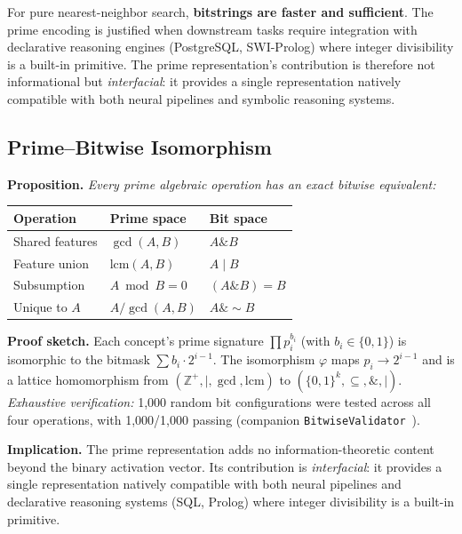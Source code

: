 \documentclass[10pt]{article}
\begin{document}
\noindent For pure nearest-neighbor search, \textbf{bitstrings are faster and sufficient}. The prime encoding is justified when downstream tasks require integration with declarative reasoning engines (PostgreSQL, SWI-Prolog) where integer divisibility is a built-in primitive. The prime representation's contribution is therefore not informational but \emph{interfacial}: it provides a single representation natively compatible with both neural pipelines and symbolic reasoning systems.

\subsection{Prime--Bitwise Isomorphism}

\noindent\textbf{Proposition.} \emph{Every prime algebraic operation has an exact bitwise equivalent:}

\begin{center}
\small
\begin{tabular}{lll}
\toprule
\textbf{Operation} & \textbf{Prime space} & \textbf{Bit space} \\
\midrule
Shared features & $\gcd(A, B)$ & $A \mathbin{\&} B$ \\
Feature union & $\text{lcm}(A, B)$ & $A \mathbin{|} B$ \\
Subsumption & $A \bmod B = 0$ & $(A \mathbin{\&} B) = B$ \\
Unique to $A$ & $A / \gcd(A,B)$ & $A \mathbin{\&} {\sim}B$ \\
\bottomrule
\end{tabular}
\end{center}

\noindent\textbf{Proof sketch.} Each concept's prime signature $\prod p_i^{b_i}$ (with $b_i \in \{0,1\}$) is isomorphic to the bitmask $\sum b_i \cdot 2^{i-1}$. The isomorphism $\varphi$ maps $p_i \to 2^{i-1}$ and is a lattice homomorphism from $(\mathbb{Z}^+, \mid, \gcd, \text{lcm})$ to $(\{0,1\}^k, \subseteq, \mathbin{\&}, \mathbin{|})$. \emph{Exhaustive verification:} 1{,}000 random bit configurations were tested across all four operations, with 1{,}000/1{,}000 passing (companion \texttt{BitwiseValidator}~\cite{ornelas2026triadicgpt}).

\smallskip
\noindent\textbf{Implication.} The prime representation adds no information-theoretic content beyond the binary activation vector. Its contribution is \emph{interfacial}: it provides a single representation natively compatible with both neural pipelines and declarative reasoning systems (SQL, Prolog) where integer divisibility is a built-in primitive.
\end{document}
